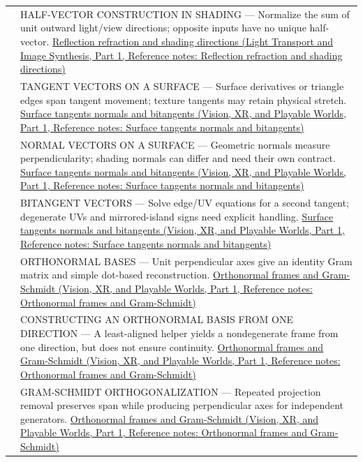 {\begin{longtable}[]{@{}
  >{\raggedright\arraybackslash}p{}
  >{\raggedright\arraybackslash}p{}@{}}
555 & HALF-VECTOR CONSTRUCTION IN SHADING --- Normalize the sum of unit outward light/view directions; opposite inputs have no unique half-vector. \href{../04-Light-Transport-and-Image-Synthesis-P01/main.pdf\#appendix-44e00863b4d5}{Reflection refraction and shading directions (Light Transport and Image Synthesis, Part 1, Reference notes: Reflection refraction and shading directions)} \\
556 & TANGENT VECTORS ON A SURFACE --- Surface derivatives or triangle edges span tangent movement; texture tangents may retain physical stretch. \href{../07-Vision-XR-and-Playable-Worlds-P01/main.pdf\#appendix-e31893dec985}{Surface tangents normals and bitangents (Vision, XR, and Playable Worlds, Part 1, Reference notes: Surface tangents normals and bitangents)} \\
557 & NORMAL VECTORS ON A SURFACE --- Geometric normals measure perpendicularity; shading normals can differ and need their own contract. \href{../07-Vision-XR-and-Playable-Worlds-P01/main.pdf\#appendix-e31893dec985}{Surface tangents normals and bitangents (Vision, XR, and Playable Worlds, Part 1, Reference notes: Surface tangents normals and bitangents)} \\
558 & BITANGENT VECTORS --- Solve edge/UV equations for a second tangent; degenerate UVs and mirrored-island signs need explicit handling. \href{../07-Vision-XR-and-Playable-Worlds-P01/main.pdf\#appendix-e31893dec985}{Surface tangents normals and bitangents (Vision, XR, and Playable Worlds, Part 1, Reference notes: Surface tangents normals and bitangents)} \\
559 & ORTHONORMAL BASES --- Unit perpendicular axes give an identity Gram matrix and simple dot-based reconstruction. \href{../07-Vision-XR-and-Playable-Worlds-P01/main.pdf\#appendix-c39f1ed34271}{Orthonormal frames and Gram-Schmidt (Vision, XR, and Playable Worlds, Part 1, Reference notes: Orthonormal frames and Gram-Schmidt)} \\
560 & CONSTRUCTING AN ORTHONORMAL BASIS FROM ONE DIRECTION --- A least-aligned helper yields a nondegenerate frame from one direction, but does not ensure continuity. \href{../07-Vision-XR-and-Playable-Worlds-P01/main.pdf\#appendix-c39f1ed34271}{Orthonormal frames and Gram-Schmidt (Vision, XR, and Playable Worlds, Part 1, Reference notes: Orthonormal frames and Gram-Schmidt)} \\
561 & GRAM-SCHMIDT ORTHOGONALIZATION --- Repeated projection removal preserves span while producing perpendicular axes for independent generators. \href{../07-Vision-XR-and-Playable-Worlds-P01/main.pdf\#appendix-c39f1ed34271}{Orthonormal frames and Gram-Schmidt (Vision, XR, and Playable Worlds, Part 1, Reference notes: Orthonormal frames and Gram-Schmidt)} \\

\end{longtable}}
